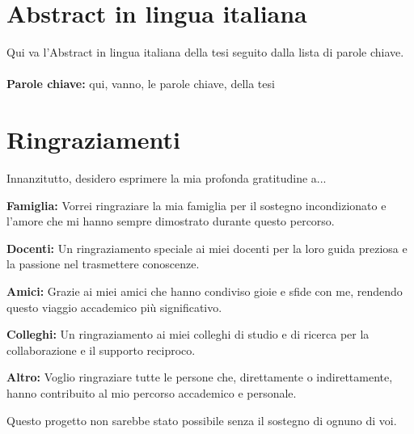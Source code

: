 \documentclass{Configuration_Files/PoliMi3i_thesis}
\begin{document}
\chapter*{Abstract in lingua italiana}
Qui va l'Abstract in lingua italiana della tesi seguito dalla lista di parole chiave.
\\
\\
\textbf{Parole chiave:} qui, vanno, le parole chiave, della tesi %


\chapter*{Ringraziamenti}

Innanzitutto, desidero esprimere la mia profonda gratitudine a...

\textbf{Famiglia:} Vorrei ringraziare la mia famiglia per il sostegno incondizionato e l'amore che mi hanno sempre dimostrato durante questo percorso.

\textbf{Docenti:} Un ringraziamento speciale ai miei docenti per la loro guida preziosa e la passione nel trasmettere conoscenze.

\textbf{Amici:} Grazie ai miei amici che hanno condiviso gioie e sfide con me, rendendo questo viaggio accademico più significativo.

\textbf{Colleghi:} Un ringraziamento ai miei colleghi di studio e di ricerca per la collaborazione e il supporto reciproco.

\textbf{Altro:} Voglio ringraziare tutte le persone che, direttamente o indirettamente, hanno contribuito al mio percorso accademico e personale.

Questo progetto non sarebbe stato possibile senza il sostegno di ognuno di voi.

\cleardoublepage


\thispagestyle{empty}
\tableofcontents %
\thispagestyle{empty}
\cleardoublepage
\end{document}
